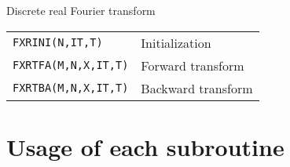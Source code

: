 \documentclass[a4paper]{scrartcl}
\begin{document}
  \vspace{1ex}
  
\noindent  
Discrete real Fourier transform

  \vspace{1ex}

  \begin{tabular}{ll}
    \texttt{FXRINI(N,IT,T)} & Initialization\\
    \texttt{FXRTFA(M,N,X,IT,T)} & Forward transform\\
    \texttt{FXRTBA(M,N,X,IT,T)} & Backward transform
  \end{tabular}

\newpage  
    
\section{Usage of each subroutine}
\end{document}
